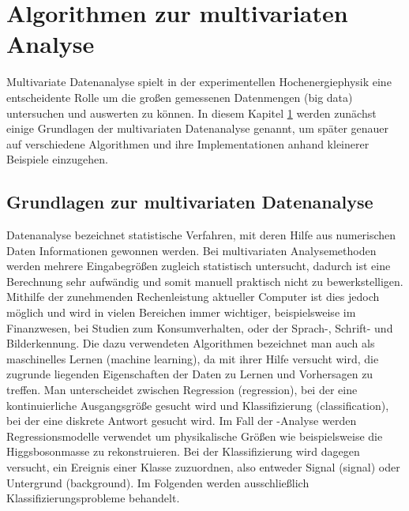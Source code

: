 \chapter{Algorithmen zur multivariaten Analyse}
\label{ch:algorithmen}

{}	%

Multivariate Datenanalyse spielt in der experimentellen Hochenergiephysik eine entscheidente Rolle um die gro\ss en gemessenen Datenmengen (big data) untersuchen und auswerten zu k\"onnen. In diesem Kapitel \ref{ch:algorithmen} werden zun\"achst einige Grundlagen der multivariaten Datenanalyse genannt, um sp\"ater genauer auf verschiedene Algorithmen und ihre Implementationen anhand kleinerer Beispiele einzugehen.

\section{Grundlagen zur multivariaten Datenanalyse}
\label{ch:Theorie:sec:Algorithmen}

Datenanalyse bezeichnet statistische Verfahren, mit deren Hilfe aus numerischen Daten Informationen gewonnen werden.
Bei multivariaten Analysemethoden werden mehrere Eingabegr\"o\ss en zugleich statistisch untersucht, dadurch ist eine Berechnung sehr aufw\"andig und somit manuell praktisch nicht zu bewerkstelligen. Mithilfe der zunehmenden Rechenleistung aktueller Computer ist dies jedoch m\"oglich und wird in vielen Bereichen immer wichtiger, beispielsweise im Finanzwesen, bei Studien zum Konsumverhalten, oder der Sprach-, Schrift- und Bilderkennung.
Die dazu verwendeten Algorithmen bezeichnet man auch als maschinelles Lernen (machine learning), da mit ihrer Hilfe versucht wird, die zugrunde liegenden Eigenschaften der Daten zu Lernen und Vorhersagen zu treffen. Man unterscheidet zwischen Regression (regression), bei der eine kontinuierliche Ausgangsgr\"o\ss e gesucht wird und Klassifizierung (classification), bei der eine diskrete Antwort gesucht wird.\cite{SWB-455193959} Im Fall der \ttH-Analyse werden Regressionsmodelle verwendet um physikalische Gr\"o\ss en wie beispielsweise die Higgsbosonmasse zu rekonstruieren. Bei der Klassifizierung wird dagegen versucht, ein Ereignis einer Klasse zuzuordnen, also entweder Signal (signal) oder Untergrund (background). Im Folgenden werden ausschlie\ss lich Klassifizierungsprobleme behandelt.

